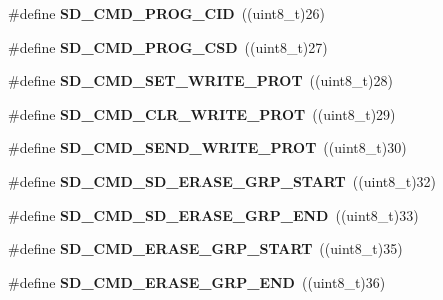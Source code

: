 \begin{DoxyCompactItemize}
\item 
\#define {\bfseries S\+D\+\_\+\+C\+M\+D\+\_\+\+P\+R\+O\+G\+\_\+\+C\+ID}~((uint8\+\_\+t)26)\hypertarget{group__sd__card_gae4c3d35575ecc87fb571f2bfb80f3847}{}\label{group__sd__card_gae4c3d35575ecc87fb571f2bfb80f3847}

\item 
\#define {\bfseries S\+D\+\_\+\+C\+M\+D\+\_\+\+P\+R\+O\+G\+\_\+\+C\+SD}~((uint8\+\_\+t)27)\hypertarget{group__sd__card_gaf911e3c602583e43e3bc16def5feebfc}{}\label{group__sd__card_gaf911e3c602583e43e3bc16def5feebfc}

\item 
\#define {\bfseries S\+D\+\_\+\+C\+M\+D\+\_\+\+S\+E\+T\+\_\+\+W\+R\+I\+T\+E\+\_\+\+P\+R\+OT}~((uint8\+\_\+t)28)\hypertarget{group__sd__card_ga7a35e2c3f9d6237bf7a3577225d077d8}{}\label{group__sd__card_ga7a35e2c3f9d6237bf7a3577225d077d8}

\item 
\#define {\bfseries S\+D\+\_\+\+C\+M\+D\+\_\+\+C\+L\+R\+\_\+\+W\+R\+I\+T\+E\+\_\+\+P\+R\+OT}~((uint8\+\_\+t)29)\hypertarget{group__sd__card_gac1c159cda7e89dfc085ac66e90790a56}{}\label{group__sd__card_gac1c159cda7e89dfc085ac66e90790a56}

\item 
\#define {\bfseries S\+D\+\_\+\+C\+M\+D\+\_\+\+S\+E\+N\+D\+\_\+\+W\+R\+I\+T\+E\+\_\+\+P\+R\+OT}~((uint8\+\_\+t)30)\hypertarget{group__sd__card_gabeb680262be8cc173543ae8b1874c83d}{}\label{group__sd__card_gabeb680262be8cc173543ae8b1874c83d}

\item 
\#define {\bfseries S\+D\+\_\+\+C\+M\+D\+\_\+\+S\+D\+\_\+\+E\+R\+A\+S\+E\+\_\+\+G\+R\+P\+\_\+\+S\+T\+A\+RT}~((uint8\+\_\+t)32)\hypertarget{group__sd__card_ga34496e2b57973936b853bb1d20dc277d}{}\label{group__sd__card_ga34496e2b57973936b853bb1d20dc277d}

\item 
\#define {\bfseries S\+D\+\_\+\+C\+M\+D\+\_\+\+S\+D\+\_\+\+E\+R\+A\+S\+E\+\_\+\+G\+R\+P\+\_\+\+E\+ND}~((uint8\+\_\+t)33)\hypertarget{group__sd__card_gae3118ae546ea7ba60735b866552047ac}{}\label{group__sd__card_gae3118ae546ea7ba60735b866552047ac}

\item 
\#define {\bfseries S\+D\+\_\+\+C\+M\+D\+\_\+\+E\+R\+A\+S\+E\+\_\+\+G\+R\+P\+\_\+\+S\+T\+A\+RT}~((uint8\+\_\+t)35)\hypertarget{group__sd__card_gae91f1c058f4b0aace233e0e4866fa1d3}{}\label{group__sd__card_gae91f1c058f4b0aace233e0e4866fa1d3}

\item 
\#define {\bfseries S\+D\+\_\+\+C\+M\+D\+\_\+\+E\+R\+A\+S\+E\+\_\+\+G\+R\+P\+\_\+\+E\+ND}~((uint8\+\_\+t)36)\hypertarget{group__sd__card_gabd1685e886f2b4cdeed5813d430a9bf3}{}\label{group__sd__card_gabd1685e886f2b4cdeed5813d430a9bf3}


\end{DoxyCompactItemize}
